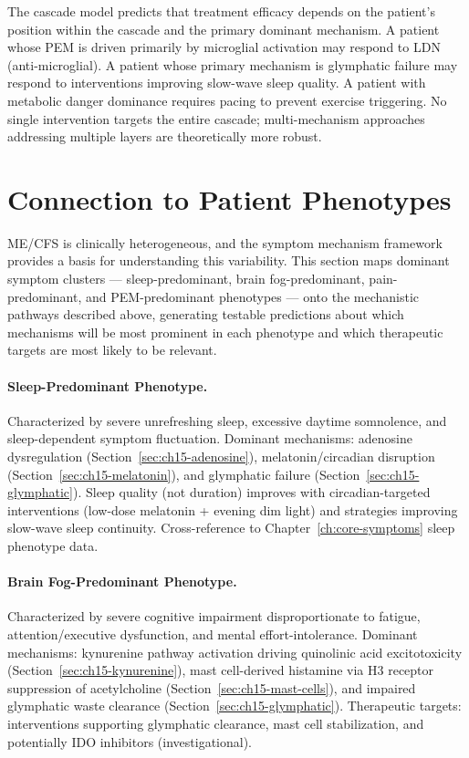 The cascade model predicts that treatment efficacy depends on the patient's position within the cascade and the primary dominant mechanism. A patient whose PEM is driven primarily by microglial activation may respond to LDN (anti-microglial). A patient whose primary mechanism is glymphatic failure may respond to interventions improving slow-wave sleep quality. A patient with metabolic danger dominance requires pacing to prevent exercise triggering. No single intervention targets the entire cascade; multi-mechanism approaches addressing multiple layers are theoretically more robust.


\section{Connection to Patient Phenotypes}
\label{sec:ch15-phenotypes}

ME/CFS is clinically heterogeneous, and the symptom mechanism framework provides a basis for understanding this variability. This section maps dominant symptom clusters --- sleep-predominant, brain fog-predominant, pain-predominant, and PEM-predominant phenotypes --- onto the mechanistic pathways described above, generating testable predictions about which mechanisms will be most prominent in each phenotype and which therapeutic targets are most likely to be relevant.

\paragraph{Sleep-Predominant Phenotype.} Characterized by severe unrefreshing sleep, excessive daytime somnolence, and sleep-dependent symptom fluctuation. Dominant mechanisms: adenosine dysregulation (Section~\ref{sec:ch15-adenosine}), melatonin/circadian disruption (Section~\ref{sec:ch15-melatonin}), and glymphatic failure (Section~\ref{sec:ch15-glymphatic}). Sleep quality (not duration) improves with circadian-targeted interventions (low-dose melatonin + evening dim light) and strategies improving slow-wave sleep continuity. Cross-reference to Chapter~\ref{ch:core-symptoms} sleep phenotype data.

\paragraph{Brain Fog-Predominant Phenotype.} Characterized by severe cognitive impairment disproportionate to fatigue, attention/executive dysfunction, and mental effort-intolerance. Dominant mechanisms: kynurenine pathway activation driving quinolinic acid excitotoxicity (Section~\ref{sec:ch15-kynurenine}), mast cell-derived histamine via H3 receptor suppression of acetylcholine (Section~\ref{sec:ch15-mast-cells}), and impaired glymphatic waste clearance (Section~\ref{sec:ch15-glymphatic}). Therapeutic targets: interventions supporting glymphatic clearance, mast cell stabilization, and potentially IDO inhibitors (investigational).

